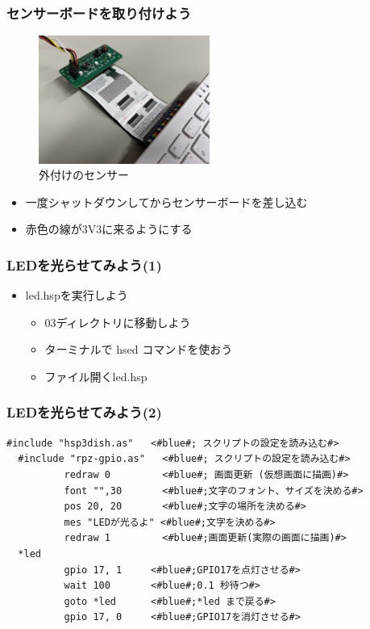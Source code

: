 \begin{frame}
  \frametitle{センサーボードを取り付けよう}
  \begin{figure}
    \centering

    \includegraphics[width=0.5\textwidth]{../images/chap03/how_to_install_bme280.jpg}
    \caption{外付けのセンサー}
  \end{figure}
  \begin{itemize}
    \item 一度シャットダウンしてからセンサーボードを差し込む
    \item 赤色の線が3V3に来るようにする
  \end{itemize}
\end{frame}

\begin{frame}
  \frametitle{LEDを光らせてみよう(1)}
  \begin{itemize}
    \item led.hspを実行しよう
          \begin{itemize}
            \item 03ディレクトリに移動しよう
            \item ターミナルで hsed コマンドを使おう
            \item ファイル\rightarrow 開く\rightarrow led.hsp
          \end{itemize}
  \end{itemize}
\end{frame}

\begin{frame}[fragile]
  \frametitle{LEDを光らせてみよう(2)}
  \begin{lstlisting}[title=led.hsp,label=led.hsp]
  #include "hsp3dish.as"   <#blue#; スクリプトの設定を読み込む#>
  #include "rpz-gpio.as"   <#blue#; スクリプトの設定を読み込む#>
          redraw 0         <#blue#; 画面更新 (仮想画面に描画)#>
          font "",30       <#blue#;文字のフォント、サイズを決める#>
          pos 20, 20       <#blue#;文字の場所を決める#>
          mes "LEDが光るよ" <#blue#;文字を決める#>
          redraw 1         <#blue#;画面更新(実際の画面に描画)#>
  *led
          gpio 17, 1     <#blue#;GPIO17を点灯させる#>
          wait 100       <#blue#;0.1 秒待つ#>
          goto *led      <#blue#;*led まで戻る#>
          gpio 17, 0     <#blue#;GPIO17を消灯させる#>
  \end{lstlisting}
\end{frame}

